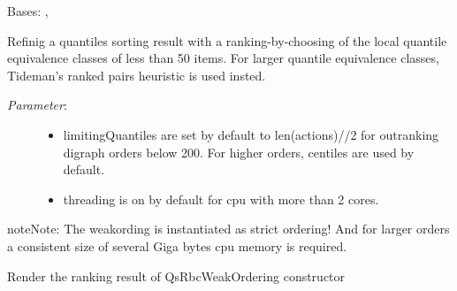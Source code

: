 \documentclass[letterpaper,10pt,english]{sphinxmanual}
\begin{document}
\begin{fulllineitems}
\label{techDoc:weakOrders.QsRbcWeakOrdering}
Bases: {\hyperref[techDoc:weakOrders.WeakOrder]{}}, {\hyperref[techDoc:sortingDigraphs.SortingDigraph]{}}

Refinig a quantiles sorting result
with a ranking-by-choosing of the local quantile equivalence classes
of less than 50 items.
For larger quantile equivalence classes, Tideman's ranked pairs heuristic
is used insted.
\begin{description}
\item[{\emph{Parameter}:}] \leavevmode\begin{itemize}
\item {} 
limitingQuantiles are set by default to len(actions)//2
for outranking digraph orders below 200.
For higher orders, centiles are used by default.

\item {} 
threading is on by default for cpu with more than 2 cores.

\end{itemize}

\end{description}

\begin{notice}{note}{Note:}
The weakording is instantiated as strict ordering! And for larger orders
a consistent size of several Giga bytes cpu memory is required.
\end{notice}

\begin{fulllineitems}
\label{techDoc:weakOrders.QsRbcWeakOrdering.computeQsRbcRanking}
Render the ranking result of QsRbcWeakOrdering constructor

\end{fulllineitems}



\end{fulllineitems}
\end{document}
